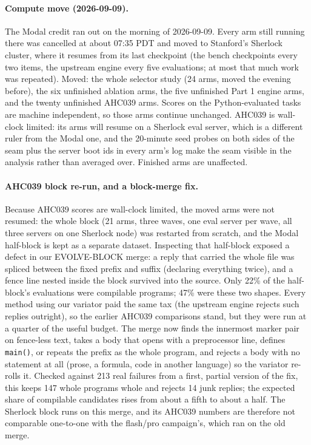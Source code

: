 \paragraph{Compute move (2026-09-09).} The Modal credit ran out on the morning of 2026-09-09. Every
arm still running there was cancelled at about 07:35 PDT and moved to Stanford's Sherlock cluster,
where it resumes from its last checkpoint (the bench checkpoints every two items, the upstream engine
every five evaluations; at most that much work was repeated). Moved: the whole selector study (24
arms, moved the evening before), the six unfinished ablation arms, the five unfinished Part 1 engine
arms, and the twenty unfinished AHC039 arms. Scores on the Python-evaluated tasks are machine
independent, so those arms continue unchanged. AHC039 is wall-clock limited: its arms will resume on
a Sherlock eval server, which is a different ruler from the Modal one, and the 20-minute seed probes
on both sides of the seam plus the server boot ids in every arm's log make the seam visible in the
analysis rather than averaged over. Finished arms are unaffected.

\paragraph{AHC039 block re-run, and a block-merge fix.} Because AHC039 scores are wall-clock limited, the
moved arms were not resumed: the whole block (21 arms, three waves, one eval server per wave, all
three servers on one Sherlock node) was restarted from scratch, and the Modal half-block is kept as a
separate dataset. Inspecting that half-block exposed a defect in our EVOLVE-BLOCK merge: a reply that
carried the whole file was spliced between the fixed prefix and suffix (declaring everything twice),
and a fence line nested inside the block survived into the source. Only 22\% of the half-block's
evaluations were compilable programs; 47\% were these two shapes. Every method using our variator
paid the same tax (the upstream engine rejects such replies outright), so the earlier AHC039
comparisons stand, but they were run at a quarter of the useful budget. The merge now finds the
innermost marker pair on fence-less text, takes a body that opens with a preprocessor line, defines
\texttt{main()}, or repeats the prefix as the whole program, and rejects a body with no statement
at all (prose, a formula, code in another language) so the variator re-rolls it. Checked against
213 real failures from a first, partial version of the fix, this keeps 147 whole programs whole and
rejects 14 junk replies; the expected share of compilable candidates rises from about a fifth to
about a half. The Sherlock block runs on this merge, and its AHC039 numbers are therefore not
comparable one-to-one with the flash/pro campaign's, which ran on the old merge.

